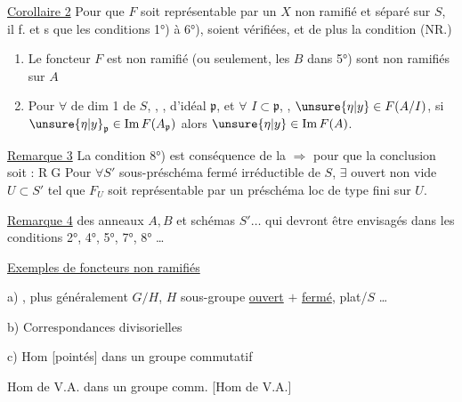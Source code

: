 \uline{Corollaire 2} Pour que $F$ soit représentable par un $X$ non ramifié et séparé sur $S$, il f. et s que les conditions 1°) à 6°),   soient vérifiées, et de plus la condition  (NR.) 

\begin{enumerate}
\item[a)] Le foncteur $F$ est non ramifié (ou seulement, les $B$ dans 5°) sont non ramifiés sur $A$
\item[\textcircled{b}] Pour $\forall$     de dim 1  de $S$, , , d'idéal   $\mathfrak p$, et $\forall$   $I\subset\mathfrak p$, , $\unsure{\eta|y}\in F(A/I)$, si $\unsure{\eta|y}_{\mathfrak p}\in\operatorname{Im}F(A_{\mathfrak p})$ alors $\unsure{\eta|y}\in\operatorname{Im}F(A)$.
\end{enumerate}

\margin{[Exprimer 8° ici par une impossibilité \uline{générique} de prolonger \ldots}

\uline{Remarque 3} La condition 8°) est conséquence de la  $\Rightarrow$  pour que la conclusion soit :
\textcircled{RG} Pour $\forall S'$  sous-préschéma fermé irréductible de $S$, $\exists$ ouvert non vide $U\subset S'$ tel que $F_U$ soit représentable par un préschéma loc de type fini sur $U$.

\uline{Remarque 4}  des anneaux $A,B$ et schémas $S'\ldots$ qui devront être envisagés dans les conditions 2°, 4°, 5°, 7°, 8° \ldots

\uline{Exemples de foncteurs non ramifiés}

a) , plus généralement $G/H$, $H$ sous-groupe \uline{ouvert} $+$ \uline{fermé}, plat/$S$ \ldots

b)   Correspondances divisorielles

c) Hom [pointés] dans un groupe commutatif

 Hom de V.A. dans un groupe comm. [Hom de V.A.]

